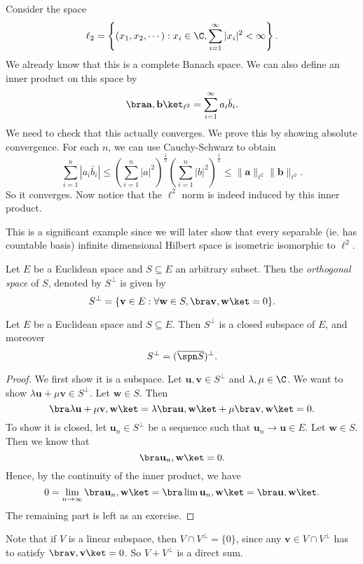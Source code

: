 \documentclass[a4paper]{article}
\begin{document}
\begin{eg}
  Consider the space
  \[
    \ell_2 = \left\{(x_1, x_2, \cdots): x_i \in \C, \sum_{i = 1}^\infty |x_i|^2 < \infty \right\}.
  \]
  We already know that this is a complete Banach space. We can also define an inner product on this space by
  \[
    \bra \mathbf{a}, \mathbf{b}\ket_{\ell^2} = \sum_{i = 1}^\infty a_i \bar{b}_i.
  \]
  We need to check that this actually converges. We prove this by showing absolute convergence. For each $n$, we can use Cauchy-Schwarz to obtain
  \[
    \sum_{i = 1}^n |a_i \bar{b}_i| \leq \left(\sum_{i = 1}^n|a|^2\right)^{\frac{1}{2}}\left(\sum_{i = 1}^n|b|^2\right)^{\frac{1}{2}} \leq \|\mathbf{a}\|_{\ell^2} \|\mathbf{b}\|_{\ell^2}.
  \]
  So it converges. Now notice that the $\ell^2$ norm is indeed induced by this inner product.
\end{eg}
This is a significant example since we will later show that every separable (ie. has countable basis) infinite dimensional Hilbert space is isometric isomorphic to $\ell^2$.

\begin{defi}
  Let $E$ be a Euclidean space and $S\subseteq E$ an arbitrary subset. Then the \emph{orthogonal space} of $S$, denoted by $S^{\perp}$ is given by
  \[
    S^{\perp} = \{\mathbf{v} \in E: \forall \mathbf{w} \in S, \bra \mathbf{v}, \mathbf{w} \ket = 0\}.
  \]
\end{defi}

\begin{prop}
  Let $E$ be a Euclidean space and $S\subseteq E$. Then $S^\perp$ is a closed subspace of $E$, and moreover
  \[
    S^{\perp} = (\overline{\spn S})^{\perp}.
  \]
\end{prop}

\begin{proof}
  We first show it is a subspace. Let $\mathbf{u}, \mathbf{v} \in S^\perp$ and $\lambda, \mu \in \C$. We want to show $\lambda \mathbf{u} + \mu \mathbf{v} \in S^\perp$. Let $\mathbf{w} \in S$. Then
  \[
    \bra \lambda \mathbf{u} + \mu \mathbf{v}, \mathbf{w}\ket = \lambda \bra \mathbf{u}, \mathbf{w}\ket + \mu \bra \mathbf{v}, \mathbf{w}\ket = 0.
  \]
  To show it is closed, let $\mathbf{u}_n \in S^\perp$ be a sequence such that $\mathbf{u}_n \to \mathbf{u} \in E$. Let $\mathbf{w} \in S$. Then we know that
  \[
    \bra \mathbf{u}_n, \mathbf{w}\ket = 0.
  \]
  Hence, by the continuity of the inner product, we have
  \[
    0 = \lim_{n \to \infty} \bra \mathbf{u}_n, \mathbf{w}\ket = \bra \lim \mathbf{u}_n, \mathbf{w}\ket = \bra \mathbf{u}, \mathbf{w}\ket.
  \]
  The remaining part is left as an exercise. %
\end{proof}
Note that if $V$ is a linear subspace, then $V \cap V^\perp = \{0\}$, since any $\mathbf{v} \in V \cap V^\perp$ has to satisfy $\bra \mathbf{v}, \mathbf{v}\ket = 0$. So $V + V^\perp$ is a direct sum.
\end{document}
